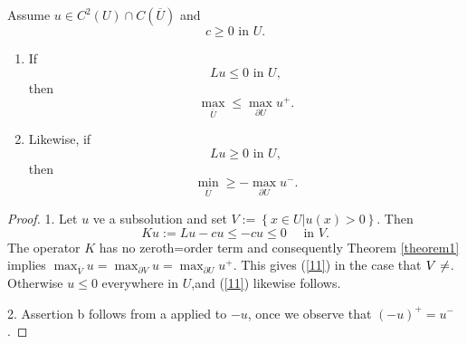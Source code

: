 \begin{theorem}
  Assume $u\in C^2(U)\cap C(\overline{U})$ and 
  \[
  c\ge 0 \text{ in }U.
  \] 
  \begin{enumerate}
    \item If 
      \[
      Lu\le 0 \text{ in }U,
      \] 
      then
      \begin{equation}
	\max_{\overline{U}}\le \max_{\partial U}u^{+}.\label{11}
      \end{equation}
    \item Likewise, if 
      \[
      Lu\ge 0 \text{ in }U,
      \] 
      then 
      \begin{equation}
        \min_{\overline{U}}\ge -\max_{\partial U}u^-.
      \end{equation}
  \end{enumerate}\label{theorem2}
\end{theorem}
\begin{proof}
  1. Let $u$ ve a subsolution and set $V:=\left\{ x\in U \lvert u(x)>0 \right\} $. Then 
  \[
  Ku:=Lu-cu\le -cu\le 0 \quad \text{ in }V.
  \] 
  The operator $K$ has no zeroth=order term and consequently Theorem \ref{theorem1} implies $\max_{\overline{V}}u=\max_{\partial V}u=\max_{\partial U}u^+$. This gives (\ref{11}) in the case that $V\neq \empty$. Otherwise  $u\le 0$ everywhere in $U$,and (\ref{11}) likewise follows.

  2. Assertion b follows from a applied to $-u$, once we observe that  $\left( -u \right) ^+=u^-$.
\end{proof}
